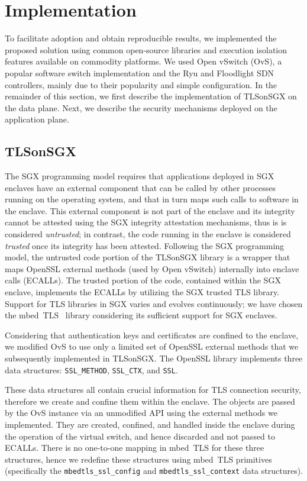 {%
\section{Implementation}
\label{sec:implem}
To facilitate adoption and obtain reproducible results, we implemented the proposed solution using common open-source libraries and execution isolation features available on commodity platforms.
We used Open vSwitch (OvS), a popular software switch implementation and the Ryu and Floodlight SDN controllers, mainly due to their popularity and simple configuration.
In the remainder of this section, we first describe the implementation of TLSonSGX on the data plane.
Next, we describe the security mechanisms deployed on the application plane.

\subsection{TLSonSGX}
\label{subsec:tlsonsgx-impl}
The SGX programming model requires that applications deployed in SGX enclaves have an external component that can be called by other processes running on the operating system, and that in turn maps such calls to software in the enclave.
This external component is not part of the enclave and its integrity cannot be attested using the SGX integrity attestation mechanisms, thus is is considered \textit{untrusted};
in contrast, the code running in the enclave is considered \textit{trusted} once its integrity has been attested.
Following the SGX programming model, the untrusted code portion of the TLSonSGX library is a wrapper that maps OpenSSL external methods (used by Open vSwitch) internally into enclave calls (ECALLs).
The trusted portion of the code, contained within the SGX enclave, implements the ECALLs by utilizing the SGX trusted TLS library.
Support for TLS libraries in SGX varies and evolves continuously; 
we have chosen the mbed~TLS~\cite{mbedtls_sgx} library considering its sufficient support for SGX enclaves.

Considering that authentication keys and certificates are confined to the enclave, we modified OvS to use only a limited set of OpenSSL external methods that we subsequently implemented in TLSonSGX.
The OpenSSL library implements three data structures: \texttt{SSL\_METHOD}, \texttt{SSL\_CTX}, and \texttt{SSL}.

These data structures all contain crucial information for TLS connection security, therefore we create and confine them within the enclave.
The objects are passed by the OvS instance via an unmodified API using the external methods we implemented.
They are created, confined, and handled inside the enclave during the operation of the virtual switch, and hence discarded and not passed to ECALLs.
There is no one-to-one mapping in mbed~TLS for these three structures, hence we redefine these structures 
using mbed~TLS primitives (specifically the \texttt{mbedtls\_ssl\_config} and \texttt{mbedtls\_ssl\_context} data structures). 

}
